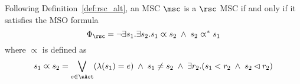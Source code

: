 Following Definition~\ref{def:rsc_alt}, an MSC $\msc$ is a $\rsc$ MSC if and only if it satisfies the MSO formula
\[
\Phi_{\rsc} = \neg \exists s_1.\exists s_2. s_1 \varpropto s_2 \;\wedge\; s_2 \varpropto^\ast s_1
\]
\noindent where $\varpropto$ is defined as
\[
s_1 \varpropto s_2 =
\bigvee_{\substack{e \in \sAct}}(\lambda(s_1) = e) \;\wedge\;
s_1 \neq s_2 \;\wedge\;
\exists r_2. (s_1 < r_2 \;\wedge\; s_2 \lhd r_2)
\]

